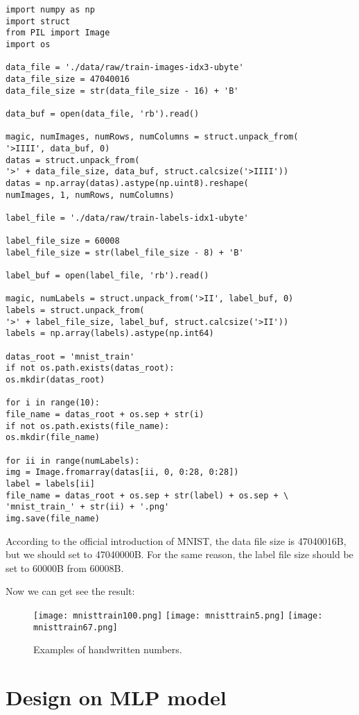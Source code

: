 \documentclass{article}
\begin{document}
\begin{verbatim}
import numpy as np
import struct
from PIL import Image
import os

data_file = './data/raw/train-images-idx3-ubyte'
data_file_size = 47040016
data_file_size = str(data_file_size - 16) + 'B'

data_buf = open(data_file, 'rb').read()

magic, numImages, numRows, numColumns = struct.unpack_from(
'>IIII', data_buf, 0)
datas = struct.unpack_from(
'>' + data_file_size, data_buf, struct.calcsize('>IIII'))
datas = np.array(datas).astype(np.uint8).reshape(
numImages, 1, numRows, numColumns)

label_file = './data/raw/train-labels-idx1-ubyte'

label_file_size = 60008
label_file_size = str(label_file_size - 8) + 'B'

label_buf = open(label_file, 'rb').read()

magic, numLabels = struct.unpack_from('>II', label_buf, 0)
labels = struct.unpack_from(
'>' + label_file_size, label_buf, struct.calcsize('>II'))
labels = np.array(labels).astype(np.int64)

datas_root = 'mnist_train'
if not os.path.exists(datas_root):
os.mkdir(datas_root)

for i in range(10):
file_name = datas_root + os.sep + str(i)
if not os.path.exists(file_name):
os.mkdir(file_name)

for ii in range(numLabels):
img = Image.fromarray(datas[ii, 0, 0:28, 0:28])
label = labels[ii]
file_name = datas_root + os.sep + str(label) + os.sep + \
'mnist_train_' + str(ii) + '.png'
img.save(file_name)
\end{verbatim}

According to the official introduction of MNIST, the data file size is 47040016B, but we should set to 47040000B. For the same reason, the label file size should be set to 60000B from 60008B.

Now we can get see the result:
\begin{figure}[htb]
	    \centering	
        \texttt{[image: mnisttrain100.png]}
		\texttt{[image: mnisttrain5.png]}
		\texttt{[image: mnisttrain67.png]}
		
	\caption{Examples of handwritten numbers.}
\end{figure}


\section{Design on MLP model}
\label{headings}
\end{document}
